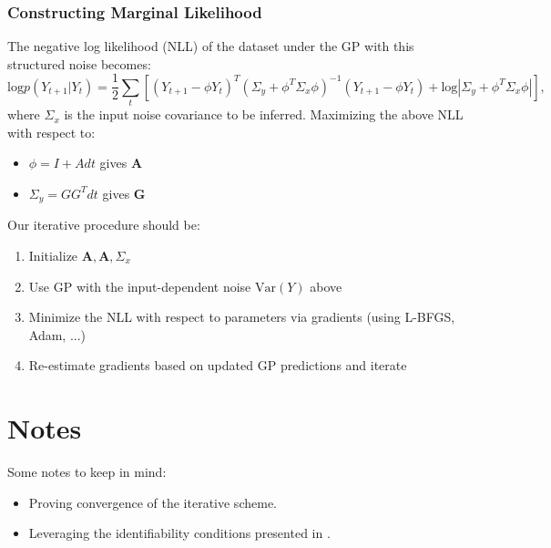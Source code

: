 \documentclass[a4paper, 11pt]{article}
\begin{document}
\begin{sloppypar}
\subsubsection{Constructing Marginal Likelihood}
The negative log likelihood (NLL) of the dataset under the GP with this structured noise becomes:
\[
  \text{log}p(Y_{t+1}|Y_t) = \frac{1}{2}\sum_{t} [(Y_{t+1}-\phi Y_t)^T(\Sigma_y+\phi^T\Sigma_x\phi)^{-1}(Y_{t+1}-\phi Y_t)+\text{log}|\Sigma_y+\phi^T\Sigma_x\phi|],
\]
where $\Sigma_x$ is the input noise covariance to be inferred. Maximizing the above NLL with respect to:
\begin{itemize}
  \item $\phi = I + Adt$ gives $\mathbf{A}$
  \item $\Sigma_y = GG^Tdt$ gives $\mathbf{G}$
\end{itemize}
Our iterative procedure should be:
\begin{enumerate}
  \item Initialize $\mathbf{A}, \mathbf{A}, \Sigma_x$
  \item Use GP with the input-dependent noise $\text{Var}(Y)$ above
  \item Minimize the NLL with respect to parameters via gradients (using L-BFGS, Adam, ...)
  \item Re-estimate gradients based on updated GP predictions and iterate
\end{enumerate}
\section{Notes}\label{s:3}
Some notes to keep in mind:
\begin{itemize}
  \item Proving convergence of the iterative scheme.
  \item Leveraging the identifiability conditions presented in \cite{guan2024identifyingdriftdiffusioncausal}.
\end{itemize}





\end{sloppypar}
\end{document}
